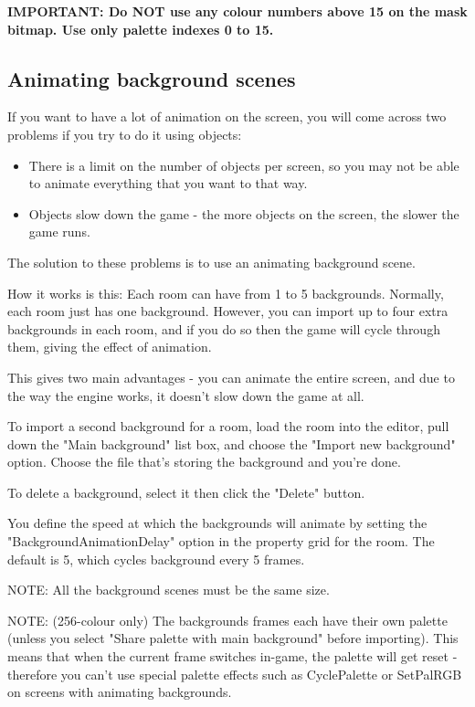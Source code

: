 \bf{IMPORTANT:} Do NOT use any colour numbers above 15 on the mask bitmap. Use only
palette indexes 0 to 15.


\subsection{Animating background scenes}%

If you want to have a lot of animation on the screen, you will come across
two problems if you try to do it using objects:
\begin{itemize}
\item There is a limit on the number of objects per screen, so you may not be able to
animate everything that you want to that way.
\item Objects slow down the game - the more objects on the screen, the slower
the game runs.
\end{itemize}
The solution to these problems is to use an animating background scene.

How it works is this: Each room can have from 1 to 5 backgrounds. Normally,
each room just has one background. However, you can import up to four extra
backgrounds in each room, and if you do so then the game will cycle through
them, giving the effect of animation.

This gives two main advantages - you can animate the entire screen, and due
to the way the engine works, it doesn't slow down the game at all.

To import a second background for a room, load the room into the editor, pull
down the "Main background" list box, and choose the "Import new background" option.
Choose the file that's storing the background and you're done.

To delete a background, select it then click the "Delete" button.

You define the speed at which the backgrounds will animate by setting the
"BackgroundAnimationDelay" option in the property grid for the room. The default
is 5, which cycles background every 5 frames.

\it{NOTE: All the background scenes must be the same size.

NOTE: (256-colour only) The backgrounds frames each have their own palette (unless
you select "Share palette with main background" before importing). This means
that when the current frame switches in-game, the palette will get reset - therefore
you can't use special palette effects such as CyclePalette or SetPalRGB on screens
with animating backgrounds.}


